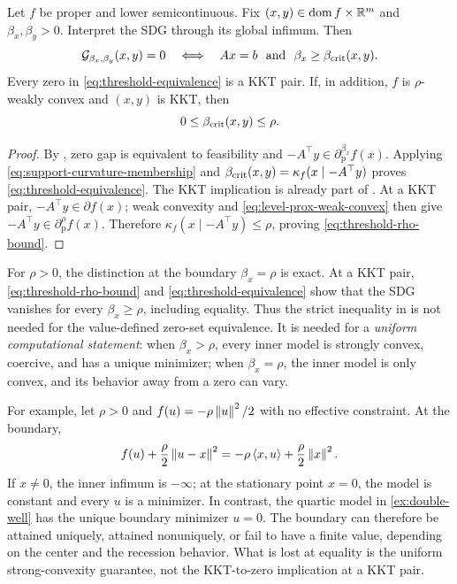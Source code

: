 \begin{theorem}
  \label{thm:pointwise-threshold}
  Let \(f\) be proper and lower semicontinuous.  Fix
  \((x,y)\in\operatorname{dom}f\times\mathbb{R}^m\) and
  \(\beta_x,\beta_y>0\).  Interpret the SDG through its global infimum.  Then
  \begin{equation}
    \mathcal{G}_{\beta_x,\beta_y}(x,y)=0
    \quad\Longleftrightarrow\quad
    Ax=b\ \text{ and }\ \beta_x\ge\beta_{\mathrm{crit}}(x,y).
    \label{eq:threshold-equivalence}
  \end{equation}
  Every zero in \cref{eq:threshold-equivalence} is a KKT pair.  If, in
  addition, \(f\) is \(\rho\)-weakly convex and \((x,y)\) is KKT, then
  \begin{equation}
    0\le\beta_{\mathrm{crit}}(x,y)\le\rho.
    \label{eq:threshold-rho-bound}
  \end{equation}
\end{theorem}

\begin{proof}
  By , zero gap is equivalent to feasibility and
  \(-A^\top y\in\partial_{\mathrm p}^{\beta_x}f(x)\).  Applying
  \cref{eq:support-curvature-membership} and
  \(\beta_{\mathrm{crit}}(x,y)=\kappa_f(x\mid-A^\top y)\) proves
  \cref{eq:threshold-equivalence}.  The KKT implication is already part of
  .  At a KKT pair,
  \(-A^\top y\in\partial f(x)\); weak convexity and
  \cref{eq:level-prox-weak-convex} then give
  \(-A^\top y\in\partial_{\mathrm p}^{\rho}f(x)\).  Therefore
  \(\kappa_f(x\mid-A^\top y)\le\rho\), proving
  \cref{eq:threshold-rho-bound}.
\end{proof}

For \(\rho>0\), the distinction at the boundary \(\beta_x=\rho\) is exact.  At a KKT pair,
\cref{eq:threshold-rho-bound} and
\cref{eq:threshold-equivalence} show that the SDG vanishes for every
\(\beta_x\ge\rho\), including equality.  Thus the strict inequality in
 is not needed for the value-defined zero-set
equivalence.  It is needed for a \emph{uniform computational statement}:
when \(\beta_x>\rho\), every inner model is strongly convex, coercive, and
has a unique minimizer; when \(\beta_x=\rho\), the inner model is only
convex, and its behavior away from a zero can vary.

For example, let \(\rho>0\) and
\(f(u)=-\rho\left\lVert u\right\rVert^{2}/2\) with no effective constraint.  At the boundary,
\begin{equation}
  f(u)+\frac{\rho}{2}\left\lVert u-x\right\rVert^{2}
  =
  -\rho\left\langle x,u\right\rangle+\frac{\rho}{2}\left\lVert x\right\rVert^{2}.
  \label{eq:boundary-flat-linear-model}
\end{equation}
If \(x\ne0\), the inner infimum is \(-\infty\); at the stationary point
\(x=0\), the model is constant and every \(u\) is a minimizer.  In contrast,
the quartic model in \cref{ex:double-well} has the unique boundary minimizer
\(u=0\).  The boundary can therefore be attained uniquely, attained
nonuniquely, or fail to have a finite value, depending on the center and the
recession behavior.  What is lost at equality is the uniform
strong-convexity guarantee, not the KKT-to-zero implication at a KKT pair.

